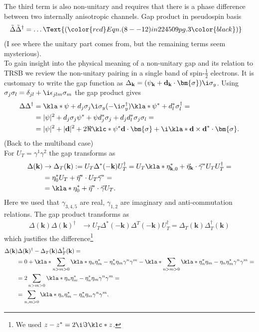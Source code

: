 \documentclass[english, parskip=full]{scrartcl}
\newcommand{\qna}[1]{\color{red}#1\color{black}}
\begin{document}
The third term is also non-unitary and requires that there is a phase difference between two internally anisotropic channels.
Gap product in pseudospin basis
\begin{align}
\tilde{\Delta} \tilde{\Delta}^\dagger &= \dots \Text{(\qna{Eqn. (8--12) in 224509 pg. 3})}
\end{align}
(\qna{I see where the unitary part comes from, but the remaining terms seem mysterious}).\\
To gain insight into the physical meaning of a non-unitary gap and its relation to TRSB we review the non-unitary pairing in a single band of spin-$\frac{1}{2}$ electrons.
It is customary to write the gap function as $\Delta_\textbf{k} = (\psi_\textbf{k} + \textbf{d}_\textbf{k} \cdot \bm{\sigma}) \i\sigma_y$.
Using $\sigma_j\sigma_l = \delta_{jl} + \i\epsilon_{jlm} \sigma_m$ the gap product gives
\begin{align}
\Delta\Delta^\dagger &= \kla*{\psi + d_j\sigma_j} \i\sigma_y (-\i \sigma_y^\dagger) \kla*{\psi^\ast + d_l^\ast \sigma_l^\dagger} = \\
&= |\psi|^2 + d_j \sigma_j \psi^\ast + \psi d_j^\ast \sigma_j + d_jd_l^\ast \sigma_j\sigma_l = \\
&= |\psi|^2 + |\textbf{d}|^2 + 2\Re \klc*{\psi^\ast \textbf{d}}\cdot \bm{\sigma} + \i \kla*{\textbf{d} \times \textbf{d}^\ast }\cdot \bm{\sigma}.
\end{align}
(Back to the multiband case)\\
For $U_T = \gamma^1\gamma^2$ the gap transforms as
\begin{align}
\Delta (\textbf{k}) &\rightarrow \Delta_T(\textbf{k}) := U_T \Delta^\ast (-\textbf{k}) U_T^\dagger = U_T \kla*{\eta_{\textbf{k},0}^\ast + \vec{\eta}_\textbf{k} \cdot \vec{\gamma}^\ast} U_TU_T^\dagger = \\
&= \eta_0^\ast  U_T + \vec{\eta}^\ast \cdot  U_T \vec{\gamma}^\ast = \\
&= \kla*{\eta_0^\ast + \vec{\eta}^\ast \cdot \vec{\gamma}} U_T. 
\end{align}
Here we used that $\gamma_{3,4,5}$ are real, $\gamma_{1,2}$ are imaginary and anti-commutation relations.
The gap product transforms as
\begin{align}
\Delta(\textbf{k}) \Delta(\textbf{k})^\dagger &\rightarrow U_T \Delta^\ast (-\textbf{k}) \Delta^T(-\textbf{k}) U_T^\dagger = \Delta_T(\textbf{k}) \Delta_T^\dagger (\textbf{k})
\end{align}
which justifies the difference\footnote{We used $z-z^\ast = 2\i\Im\klc*{z}$.}
\begin{align}
&\Delta(\textbf{k}) \Delta(\textbf{k})^\dagger - \Delta_T(\textbf{k}) \Delta_T^\dagger (\textbf{k}) = \\
&\qquad = 0 + \kla*{\sum_{n>m>0} \kla*{\eta_n \eta_m^\ast - \eta_n^\ast \eta_m}\gamma^n\gamma^m } - \kla*{\sum_{n>m>0} \kla*{\eta_n^\ast \eta_m - \eta_n \eta_m^\ast}\gamma^n\gamma^m } = \\
&\qquad = 2\sum_{n>m>0} \kla*{\eta_n \eta_m^\ast - \eta_n^\ast \eta_m}\gamma^n\gamma^m = \\
&\qquad = \sum_{n,m>0} \kla*{\eta_n \eta_m^\ast - \eta_n^\ast \eta_m}\gamma^n\gamma^m .
\end{align}
\end{document}
